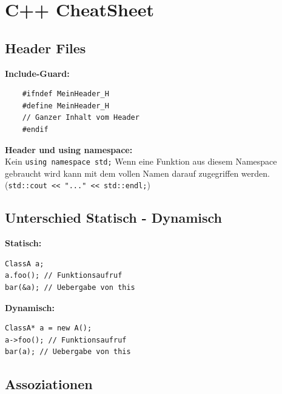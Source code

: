 \section{C++ CheatSheet}

\subsection{Header Files}
\begin{multicols}{2}
	\textbf{Include-Guard:}
	\begin{lstlisting}
	#ifndef MeinHeader_H
	#define MeinHeader_H
	// Ganzer Inhalt vom Header
	#endif
	\end{lstlisting}
	
	\textbf{Header und using namespace:} \\
	Kein \lstinline!using namespace std;! Wenn eine Funktion aus
	diesem Namespace gebraucht wird kann mit dem vollen Namen darauf
	zugegriffen werden. (\lstinline!std::cout << "..." << std::endl;!)
\end{multicols}


\subsection{Unterschied Statisch - Dynamisch}
\begin{multicols}{2}
\textbf{Statisch:}
\begin{lstlisting}
ClassA a;
a.foo(); // Funktionsaufruf
bar(&a); // Uebergabe von this
\end{lstlisting}

\textbf{Dynamisch:} 
\begin{lstlisting}
ClassA* a = new A();
a->foo(); // Funktionsaufruf
bar(a); // Uebergabe von this
\end{lstlisting}
\end{multicols}

\subsection{Assoziationen}
